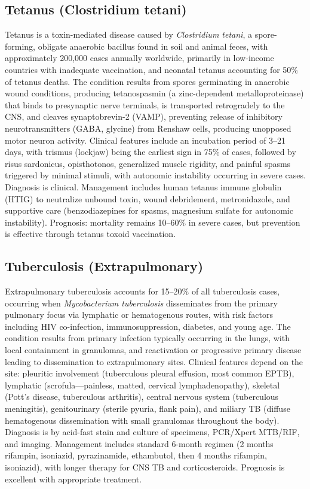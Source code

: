 \subsection{Tetanus (Clostridium tetani)}
\label{sec:Tetanus}
Tetanus is a toxin-mediated disease caused by \textit{Clostridium tetani}, a spore-forming, obligate anaerobic bacillus found in soil and animal feces, with approximately 200,000 cases annually worldwide, primarily in low-income countries with inadequate vaccination, and neonatal tetanus accounting for 50\% of tetanus deaths. The condition results from spores germinating in anaerobic wound conditions, producing tetanospasmin (a zinc-dependent metalloproteinase) that binds to presynaptic nerve terminals, is transported retrogradely to the CNS, and cleaves synaptobrevin-2 (VAMP), preventing release of inhibitory neurotransmitters (GABA, glycine) from Renshaw cells, producing unopposed motor neuron activity. Clinical features include an incubation period of 3--21 days, with trismus (lockjaw) being the earliest sign in 75\% of cases, followed by risus sardonicus, opisthotonos, generalized muscle rigidity, and painful spasms triggered by minimal stimuli, with autonomic instability occurring in severe cases. Diagnosis is clinical. Management includes human tetanus immune globulin (HTIG) to neutralize unbound toxin, wound debridement, metronidazole, and supportive care (benzodiazepines for spasms, magnesium sulfate for autonomic instability). Prognosis: mortality remains 10--60\% in severe cases, but prevention is effective through tetanus toxoid vaccination.

\subsection{Tuberculosis (Extrapulmonary)}
\label{sec:Tuberculosis (Extrapulmonary)}
Extrapulmonary tuberculosis accounts for 15--20\% of all tuberculosis cases, occurring when \textit{Mycobacterium tuberculosis} disseminates from the primary pulmonary focus via lymphatic or hematogenous routes, with risk factors including HIV co-infection, immunosuppression, diabetes, and young age. The condition results from primary infection typically occurring in the lungs, with local containment in granulomas, and reactivation or progressive primary disease leading to dissemination to extrapulmonary sites. Clinical features depend on the site: pleuritic involvement (tuberculous pleural effusion, most common EPTB), lymphatic (scrofula---painless, matted, cervical lymphadenopathy), skeletal (Pott's disease, tuberculous arthritis), central nervous system (tuberculous meningitis), genitourinary (sterile pyuria, flank pain), and miliary TB (diffuse hematogenous dissemination with small granulomas throughout the body). Diagnosis is by acid-fast stain and culture of specimens, PCR/Xpert MTB/RIF, and imaging. Management includes standard 6-month regimen (2 months rifampin, isoniazid, pyrazinamide, ethambutol, then 4 months rifampin, isoniazid), with longer therapy for CNS TB and corticosteroids. Prognosis is excellent with appropriate treatment.

